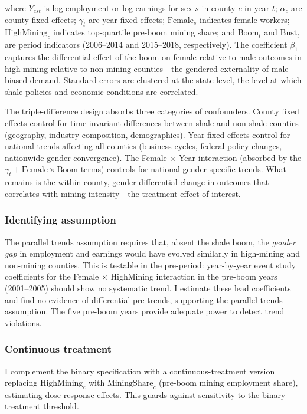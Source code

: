 \documentclass[12pt]{article}
\begin{document}
\noindent where $Y_{cst}$ is log employment or log earnings for sex $s$ in county $c$ in year $t$; $\alpha_c$ are county fixed effects; $\gamma_t$ are year fixed effects; $\text{Female}_s$ indicates female workers; $\text{HighMining}_c$ indicates top-quartile pre-boom mining share; and $\text{Boom}_t$ and $\text{Bust}_t$ are period indicators (2006--2014 and 2015--2018, respectively). The coefficient $\beta_1$ captures the differential effect of the boom on female relative to male outcomes in high-mining relative to non-mining counties---the gendered externality of male-biased demand. Standard errors are clustered at the state level, the level at which shale policies and economic conditions are correlated.

The triple-difference design absorbs three categories of confounders. County fixed effects control for time-invariant differences between shale and non-shale counties (geography, industry composition, demographics). Year fixed effects control for national trends affecting all counties (business cycles, federal policy changes, nationwide gender convergence). The Female $\times$ Year interaction (absorbed by the $\gamma_t + \text{Female} \times \text{Boom}$ terms) controls for national gender-specific trends. What remains is the within-county, gender-differential change in outcomes that correlates with mining intensity---the treatment effect of interest.

\subsubsection*{Identifying assumption} The parallel trends assumption requires that, absent the shale boom, the \textit{gender gap} in employment and earnings would have evolved similarly in high-mining and non-mining counties. This is testable in the pre-period: year-by-year event study coefficients for the Female $\times$ HighMining interaction in the pre-boom years (2001--2005) should show no systematic trend. I estimate these lead coefficients and find no evidence of differential pre-trends, supporting the parallel trends assumption. The five pre-boom years provide adequate power to detect trend violations.

\subsubsection*{Continuous treatment} I complement the binary specification with a continuous-treatment version replacing $\text{HighMining}_c$ with $\text{MiningShare}_c$ (pre-boom mining employment share), estimating dose-response effects. This guards against sensitivity to the binary treatment threshold.
\end{document}
